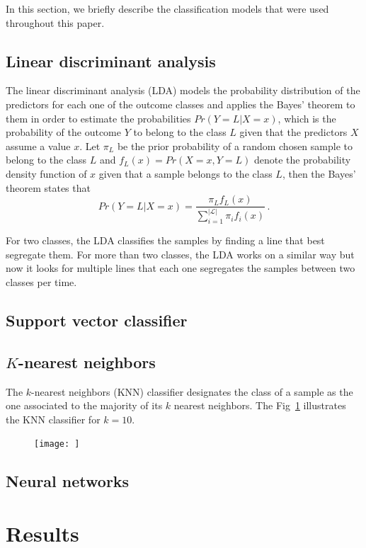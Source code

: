 \documentclass[conference]{IEEEtran}
\begin{document}
In this section, we briefly describe the classification models that were used throughout this paper.

\subsection{Linear discriminant analysis}
The linear discriminant analysis (LDA) models the probability distribution of the predictors for each one of the outcome classes and applies the Bayes' theorem to them in order to estimate the probabilities $Pr(Y=L | X=x)$, which is the probability of the outcome $Y$ to belong to the class $L$ given that the predictors $X$ assume a value $x$. Let $\pi_L$ be the prior probability of a random chosen sample to belong to the class $L$ and $f_L(x) = Pr(X=x, Y=L)$ denote the probability density function of $x$ given that a sample belongs to the class $L$, then the Bayes' theorem states that
%
\begin{equation}
  Pr(Y=L | X=x) = \frac{\pi_L f_L(x)}{\sum_{i = 1}^{|\mathcal{L}|} \pi_i f_i(x)}\,.
\end{equation}

For two classes, the LDA classifies the samples by finding a line that best segregate them. For more than two classes, the LDA works on a similar way but now it looks for multiple lines that each one segregates the samples between two classes per time.

\subsection{Support vector classifier}

\subsection{$K$-nearest neighbors}

The $k$-nearest neighbors (KNN) classifier designates the class of a sample as the one associated to the majority of its $k$ nearest neighbors. The Fig~\ref{fig:knn} illustrates the KNN classifier for $k = 10$. 
%
\begin{figure}
  \texttt{[image: ]}
  \caption{}
  \label{fig:knn}
\end{figure}

\subsection{Neural networks}


\section{Results} \label{sec:results}
\end{document}
